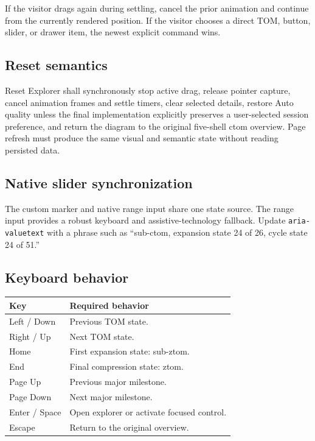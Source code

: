 \documentclass[11pt,letterpaper]{article}
\begin{document}
If the visitor drags again during settling, cancel the prior animation and continue from the currently rendered position. If the visitor chooses a direct TOM, button, slider, or drawer item, the newest explicit command wins.

\subsection{Reset semantics}
Reset Explorer shall synchronously stop active drag, release pointer capture, cancel animation frames and settle timers, clear selected details, restore Auto quality unless the final implementation explicitly preserves a user-selected session preference, and return the diagram to the original five-shell ctom overview. Page refresh must produce the same visual and semantic state without reading persisted data.

\subsection{Native slider synchronization}
The custom marker and native range input share one state source. The range input provides a robust keyboard and assistive-technology fallback. Update \texttt{aria-valuetext} with a phrase such as ``sub-ctom, expansion state 24 of 26, cycle state 24 of 51.''

\subsection{Keyboard behavior}
\begin{tabularx}{\textwidth}{L{1.6in}Y}
\toprule
\textbf{Key} & \textbf{Required behavior} \\
\midrule
Left / Down & Previous TOM state. \\
Right / Up & Next TOM state. \\
Home & First expansion state: sub-ztom. \\
End & Final compression state: ztom. \\
Page Up & Previous major milestone. \\
Page Down & Next major milestone. \\
Enter / Space & Open explorer or activate focused control. \\
Escape & Return to the original overview. \\
\bottomrule
\end{tabularx}
\end{document}
